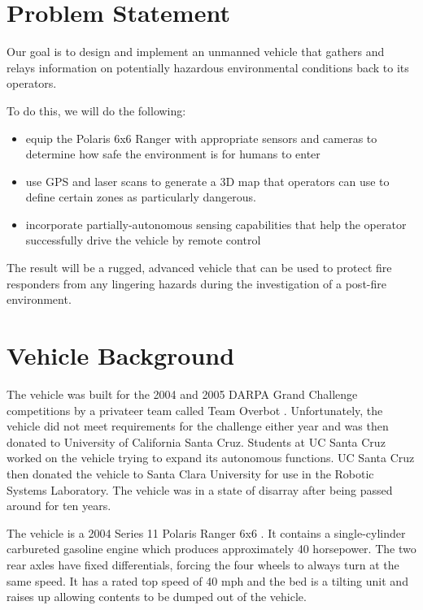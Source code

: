 \section{Problem Statement}

Our goal is to design and implement an unmanned vehicle
that gathers and relays information on potentially 
hazardous environmental conditions back to its operators.

To do this, we will do the following:
\begin{itemize}
\item equip the Polaris 6x6 Ranger with appropriate sensors and cameras to determine how safe the environment is for humans to enter
\item use GPS and laser scans to generate a 3D map that operators can use to define certain zones as particularly dangerous.
\item incorporate partially-autonomous sensing capabilities that help the operator successfully drive the vehicle by remote control
 \end{itemize} 
 The result will be a rugged, advanced vehicle that can be used to protect fire responders from any lingering hazards during the investigation of a post-fire environment. 



\section{Vehicle Background}
The vehicle was built for the 2004 and 2005 DARPA Grand Challenge competitions by a privateer team called Team Overbot \cite{rslrover2014}.  Unfortunately, the vehicle did not meet requirements for the challenge either year and was then donated to University of California Santa Cruz.  Students at UC Santa Cruz worked on the vehicle trying to expand its autonomous functions.   UC Santa Cruz then donated the vehicle to Santa Clara University for use in the Robotic Systems Laboratory.  The vehicle was in a state of disarray after being passed around for ten years.  

The vehicle is a 2004 Series 11 Polaris Ranger 6x6 \cite{rslrover2014}.  It contains a single-cylinder carbureted gasoline engine which produces approximately 40 horsepower.  The two rear axles have fixed differentials, forcing the four wheels to always turn at the same speed.  It has a rated top speed of 40 mph and the bed is a tilting unit and raises up allowing contents to be dumped out of the vehicle.  

